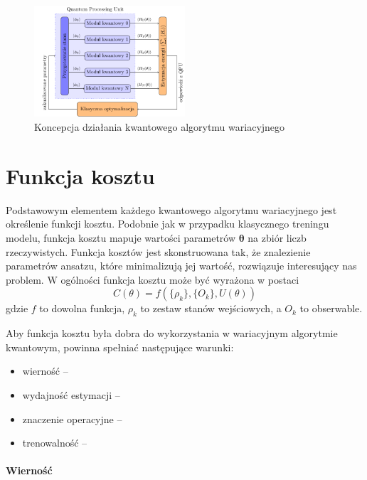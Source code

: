 \documentclass[a4paper,11pt]{article}
\begin{document}
\begin{figure}[h!]
	\centering
	\includegraphics[width=0.5\textwidth]{vqe-pl.pdf}
	\caption{Koncepcja działania kwantowego algorytmu wariacyjnego}
\end{figure}

\newpage 

\hypertarget{funkcja-kosztu}{%
	\section{Funkcja kosztu}\label{funkcja-kosztu}}

Podstawowym elementem każdego kwantowego algorytmu wariacyjnego jest określenie funkcji kosztu. Podobnie jak w przypadku klasycznego treningu modelu, funkcja kosztu mapuje wartości parametrów $\mathbf{\theta}$ na zbiór liczb rzeczywistych. Funkcja kosztów jest skonstruowana tak, że znalezienie parametrów ansatzu, które minimalizują jej wartość, rozwiązuje interesujący nas problem.  W ogólności funkcja kosztu może być wyrażona w postaci
\begin{equation}
	C(\theta)  = f(\{\rho_k\}, \{O_k\}, U(\theta))
\end{equation}
gdzie $f$ to dowolna funkcja, $\rho_k$ to zestaw stanów wejściowych, a $O_k$ to obserwable.

Aby funkcja kosztu była dobra do wykorzystania w wariacyjnym algorytmie kwantowym, powinna spełniać następujące warunki:
\begin{itemize}
	\item wierność -- 
	\item wydajność estymacji -- 
	\item znaczenie operacyjne --
	\item trenowalność -- 
\end{itemize}


\paragraph{Wierność}
\end{document}
